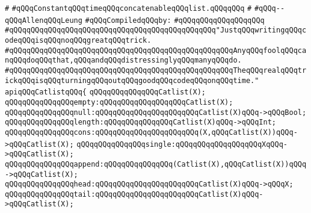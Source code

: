 \label{src/lib/std/src/catlist.api}
\verb|#|\newline
\verb|#qQQqConstantqQQqtimeqQQqconcatenableqQQqlist.qQQqqQQq|\newline
\verb|#|\newline
\verb|#qQQq--qQQqAllenqQQqLeung|\newline
\newline
\verb|#qQQqCompiledqQQqby:|\newline
\verb|#qQQqqQQqqQQqqQQqqQQq|\newline
\newline
\newline
\newline
\verb|#qQQqqQQqqQQqqQQqqQQqqQQqqQQqqQQqqQQqqQQqqQQqqQQq"JustqQQqwritingqQQqcodeqQQqisqQQqnoqQQqgreatqQQqtrick.|\newline
\verb|#qQQqqQQqqQQqqQQqqQQqqQQqqQQqqQQqqQQqqQQqqQQqqQQqqQQqAnyqQQqfoolqQQqcanqQQqdoqQQqthat,qQQqandqQQqdistressinglyqQQqmanyqQQqdo.|\newline
\verb|#qQQqqQQqqQQqqQQqqQQqqQQqqQQqqQQqqQQqqQQqqQQqqQQqqQQqTheqQQqrealqQQqtrickqQQqisqQQqturningqQQqoutqQQqgoodqQQqcodeqQQqonqQQqtime."|\newline
\newline
\newline
\newline
\verb|apiqQQqCatlistqQQq{|\newline
\newline
\verb|qQQqqQQqqQQqqQQqCatlist(X);|\newline
\newline
\verb|qQQqqQQqqQQqqQQqempty:qQQqqQQqqQQqqQQqqQQqCatlist(X);|\newline
\verb|qQQqqQQqqQQqqQQqnull:qQQqqQQqqQQqqQQqqQQqqQQqCatlist(X)qQQq->qQQqBool;|\newline
\verb|qQQqqQQqqQQqqQQqlength:qQQqqQQqqQQqqQQqCatlist(X)qQQq->qQQqInt;|\newline
\verb|qQQqqQQqqQQqqQQqcons:qQQqqQQqqQQqqQQqqQQqqQQq(X,qQQqCatlist(X))qQQq->qQQqCatlist(X);|\newline
\verb|qQQqqQQqqQQqqQQqsingle:qQQqqQQqqQQqqQQqqQQqXqQQq->qQQqCatlist(X);|\newline
\verb|qQQqqQQqqQQqqQQqappend:qQQqqQQqqQQqqQQq(Catlist(X),qQQqCatlist(X))qQQq->qQQqCatlist(X);|\newline
\verb|qQQqqQQqqQQqqQQqhead:qQQqqQQqqQQqqQQqqQQqqQQqCatlist(X)qQQq->qQQqX;|\newline
\verb|qQQqqQQqqQQqqQQqtail:qQQqqQQqqQQqqQQqqQQqqQQqCatlist(X)qQQq->qQQqCatlist(X);|\newline
